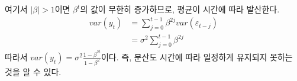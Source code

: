 \documentclass{article}
\begin{document}
여기서 $|\beta| > 1$이면 $\beta^t$의 값이 무한히 증가하므로, 평균이 시간에 따라 발산한다.
\begin{equation}
\begin{aligned}
var(y_t) &= \sum_{j=0}^{t-1}\beta^{2j}var(\varepsilon_{t-j})\\
         &= \sigma^2\sum_{j=0}^{t-1}\beta^{2j}
\end{aligned}    
\end{equation}
따라서 $var(y_t) = \sigma^2 \frac{1-\beta^{2t}}{1-\beta^2}$이다. 즉, 분산도 시간에 따라 일정하게 유지되지 못하는 것을 알 수 있다.
\end{document}

